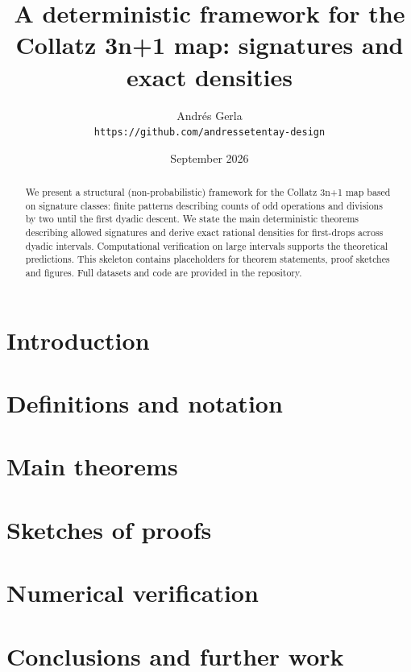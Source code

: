 \documentclass[11pt]{article}
\title{A deterministic framework for the Collatz 3n+1 map: signatures and exact densities}
\author{Andr\'es Gerla \\\texttt{https://github.com/andressetentay-design}}
\date{September 2026}
\begin{document}
\maketitle
\begin{abstract}
We present a structural (non-probabilistic) framework for the Collatz 3n+1 map based on signature classes: finite patterns describing counts of odd operations and divisions by two until the first dyadic descent. We state the main deterministic theorems describing allowed signatures and derive exact rational densities for first-drops across dyadic intervals. Computational verification on large intervals supports the theoretical predictions. This skeleton contains placeholders for theorem statements, proof sketches and figures. Full datasets and code are provided in the repository.
\end{abstract}
\section{Introduction}
\section{Definitions and notation}
\section{Main theorems}
\section{Sketches of proofs}
\section{Numerical verification}
\section{Conclusions and further work}


\end{document}
